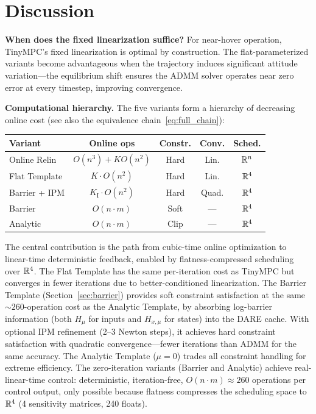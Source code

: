 \section{Discussion}\label{sec:discussion}

\textbf{When does the fixed linearization suffice?}
For near-hover operation, TinyMPC's fixed linearization is optimal
by construction.
The flat-parameterized variants become advantageous when the trajectory
induces significant attitude variation---the equilibrium shift
ensures the ADMM solver operates near zero error at every timestep,
improving convergence.

\textbf{Computational hierarchy.}
The five variants form a hierarchy of decreasing online cost
(see also the equivalence chain~\eqref{eq:full_chain}):
\begin{center}
\small
\begin{tabular}{@{}lcccc@{}}
\toprule
Variant & Online ops & Constr. & Conv. & Sched. \\
\midrule
Online Relin & $O(n^3) {+} K O(n^2)$ & Hard & Lin. & $\mathbb{R}^n$ \\
Flat Template & $K \cdot O(n^2)$ & Hard & Lin. & $\mathbb{R}^4$ \\
Barrier + IPM & $K_{\text{I}} \cdot O(n^2)$ & Hard & Quad. & $\mathbb{R}^4$ \\
Barrier & $O(n \cdot m)$ & Soft & --- & $\mathbb{R}^4$ \\
Analytic & $O(n \cdot m)$ & Clip & --- & $\mathbb{R}^4$ \\
\bottomrule
\end{tabular}
\end{center}
The central contribution is the path from cubic-time online
optimization to linear-time deterministic feedback, enabled
by flatness-compressed scheduling over $\mathbb{R}^4$.
The Flat Template has the same per-iteration cost as TinyMPC but
converges in fewer iterations due to better-conditioned linearization.
The Barrier Template (Section~\ref{sec:barrier}) provides soft
constraint satisfaction at the same ${\sim}260$-operation cost as
the Analytic Template, by absorbing log-barrier information
(both $H_\mu$ for inputs and $H_{x,\mu}$ for states)
into the DARE cache.
With optional IPM refinement (2--3 Newton steps),
it achieves hard constraint satisfaction with quadratic convergence---fewer
iterations than ADMM for the same accuracy.
The Analytic Template ($\mu = 0$) trades all constraint handling
for extreme efficiency.
The zero-iteration variants (Barrier and Analytic) achieve
real-linear-time control: deterministic, iteration-free,
$O(n{\cdot}m) \approx 260$ operations per control output,
only possible because flatness compresses the scheduling
space to $\mathbb{R}^4$ (4 sensitivity matrices, 240 floats).

